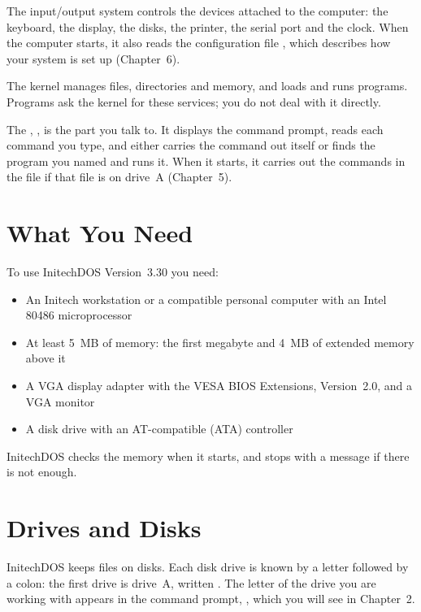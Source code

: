 The input/output system controls the devices
attached to the computer: the keyboard, the display, the disks, the printer,
the serial port and the clock.  When the computer starts, it also reads the
configuration file ,
which describes how your system is set up (Chapter~6).

The kernel manages files, directories and memory, and
loads and runs programs.  Programs ask the kernel for these services; you
do not deal with it directly.

The ,
, is the part you
talk to.  It displays the command prompt, reads each command you type, and
either carries the command out itself or finds the program you named and
runs it.  When it starts, it carries out the commands in the file
 if that file
is on drive~A (Chapter~5).

\section{What You Need}
To use InitechDOS Version~3.30 you need:
\begin{itemize}
\item An Initech workstation or a compatible personal computer with an
  Intel 80486 microprocessor
\item At least 5~MB of memory: the first megabyte and 4~MB of extended
  memory above it
\item A VGA display adapter with the VESA BIOS Extensions, Version~2.0,
  and a VGA monitor
\item A disk drive with an AT-compatible (ATA) controller
\end{itemize}
InitechDOS checks the memory when it starts, and stops with a message if
there is not enough.

\section{Drives and Disks}
InitechDOS keeps files on disks.  Each disk drive is known by a letter
followed by a colon: the first drive is drive~A, written .
The letter of the drive you are working with appears in the command prompt,
, which you will see in Chapter~2.

